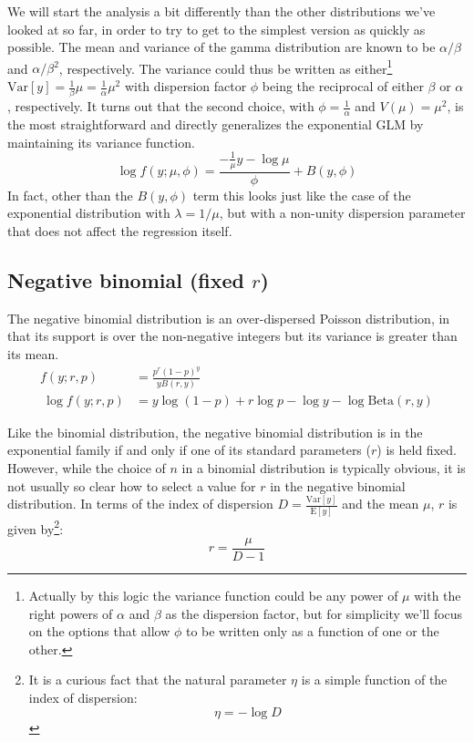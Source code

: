 \documentclass{article}
\begin{document}
We will start the analysis a bit differently than the other distributions we've
looked at so far, in order to try to get to the simplest version as quickly as
possible.
The mean and variance of the gamma distribution are known to be
\(\alpha/\beta\) and \(\alpha/\beta^2\), respectively.
The variance could thus be written as either\footnote{
  Actually by this logic the variance function could be any power of \(\mu\)
  with the right powers of \(\alpha\) and \(\beta\) as the dispersion
  factor, but for simplicity we'll focus on the options that allow \(\phi\)
  to be written only as a function of one or the other.
} \(\textrm{Var}[y] =
\frac{1}{\beta}\mu = \frac{1}{\alpha}\mu^2\) with dispersion factor \(\phi\)
being the reciprocal of either \(\beta\) or \(\alpha\), respectively.
It turns out that the second choice, with \(\phi = \frac{1}{\alpha}\) and
\(V(\mu) = \mu^2\), is the most straightforward and directly generalizes the
exponential GLM by maintaining its variance function.
\[ \log f(y; \mu, \phi) = \frac{-\frac{1}{\mu} y - \log \mu}{\phi} + B(y, \phi)
\]
In fact, other than the \(B(y, \phi)\) term this looks just like the case of
the exponential distribution with \(\lambda = 1/\mu\), but with a non-unity
dispersion parameter that does not affect the regression itself.

\subsection{Negative binomial (fixed \(r\))}

The negative binomial distribution is an over-dispersed Poisson distribution, in
that its support is over the non-negative integers but its variance is greater
than its mean.
\begin{align}
f(y; r, p) &= \frac{p^r (1-p)^y}{ y B(r, y)} \\\
\log f(y; r, p) &= y \log(1-p) + r \log p - \log y - \log \textrm{Beta}(r, y)
\end{align}

Like the binomial distribution, the negative binomial distribution is in the
exponential family if and only if one of its standard parameters (\(r\)) is
held fixed. However, while the choice of \(n\) in a binomial distribution is
typically obvious, it is not usually so clear how to select a value for \(r\)
in the negative binomial distribution.
In terms of the index of dispersion \(D =
\frac{\textrm{Var}[y]}{\textrm{E}[y]}\) and the mean \(\mu\), \(r\) is given
by\footnote{
  It is a curious fact that the natural parameter \(\eta\) is a simple
  function of the index of dispersion: \[ \eta = -\log D \]
}:
\[ r = \frac{\mu}{D-1} \]
\end{document}

